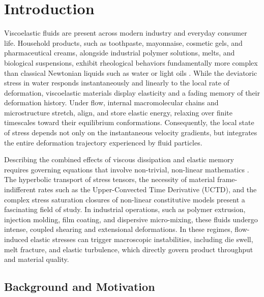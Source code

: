 \chapter{Introduction}
\label{chap:introduction}

Viscoelastic fluids are present across modern industry and everyday consumer
life. Household products, such as toothpaste, mayonnaise, cosmetic gels,
and pharmaceutical creams, alongside industrial polymer solutions, melts, and
biological suspensions, exhibit rheological behaviors fundamentally more complex
than classical Newtonian liquids such as water or light oils \cite{bird1987dynamics,
macosko1994rheology}. While the deviatoric stress in water responds instantaneously
and linearly to the local rate of deformation, viscoelastic materials display
elasticity and a fading memory of their deformation history. Under flow,
internal macromolecular chains and microstructure stretch, align, and store
elastic energy, relaxing over finite timescales toward their equilibrium
conformations. Consequently, the local state of stress depends not only on the
instantaneous velocity gradients, but integrates the entire deformation trajectory
experienced by fluid particles.

Describing the combined effects of viscous dissipation and elastic memory requires
governing equations that involve non-trivial, non-linear mathematics
\cite{owens2002computational}. The hyperbolic transport of stress tensors, the
necessity of material frame-indifferent rates such as the Upper-Convected Time
Derivative (UCTD), and the complex stress saturation closures of non-linear
constitutive models present a fascinating field of study. In
industrial operations, such as polymer extrusion, injection molding, 
film coating, and dispersive micro-mixing, these fluids undergo intense,
coupled shearing and extensional deformations. In these regimes, flow-induced
elastic stresses can trigger macroscopic instabilities, including die swell, melt
fracture, and elastic turbulence, which directly govern product throughput and
material quality.

\section{Background and Motivation}
\label{sec:background_motivation}

